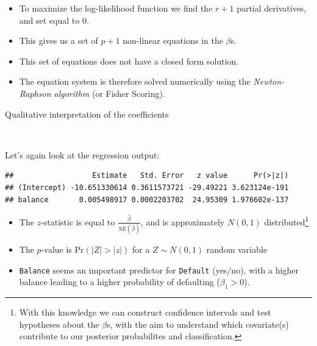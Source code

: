 \documentclass[10pt,ignorenonframetext,]{beamer}
\newenvironment{Shaded}{\begin{snugshade}}{\end{snugshade}}
\newcommand{\KeywordTok}[1]{\textcolor[rgb]{0.13,0.29,0.53}{\textbf{#1}}}
\newcommand{\OperatorTok}[1]{\textcolor[rgb]{0.81,0.36,0.00}{\textbf{#1}}}
\newcommand{\NormalTok}[1]{#1}
\begin{document}
\begin{frame}

\begin{itemize}
\item
  To maximize the log-likelihood function we find the \(r+1\) partial
  derivatives, and set equal to 0.
\item
  This gives us a set of \(p+1\) non-linear equations in the \(\beta\)s.
\item
  This set of equations does not have a closed form solution.
\item
  The equation system is therefore solved numerically using the
  \emph{Newton-Raphson algorithm} (or Fisher Scoring).
\end{itemize}

\end{frame}

\begin{frame}[fragile]

\begin{block}{Qualitative interpretation of the coefficients}

\(~\)

Let's again look at the regression output:

\scriptsize

\begin{Shaded}
\end{Shaded}

\begin{verbatim}
##                  Estimate   Std. Error   z value      Pr(>|z|)
## (Intercept) -10.651330614 0.3611573721 -29.49221 3.623124e-191
## balance       0.005498917 0.0002203702  24.95309 1.976602e-137
\end{verbatim}

\normalsize

\begin{itemize}
\item
  The \(z\)-statistic is equal to \(\frac{\hat\beta}{SE(\hat\beta)}\),
  and is approximately \(N(0,1)\)
  distributed\footnote{With this knowledge we can construct confidence intervals and test hypotheses about the $\beta$s, with the aim to understand which covariate(s) contribute to our posterior probabilites and classification.}
\item
  The \(p\)-value is \(\text{Pr}(|Z| > |z|)\) for a \(Z\sim N(0,1)\)
  random variable
\item
  \texttt{Balance} seems an important predictor for \texttt{Default}
  (yes/no), with a higher balance leading to a higher probability of
  defaulting (\(\beta_1>0\)).
\end{itemize}

\end{block}

\end{frame}
\end{document}
